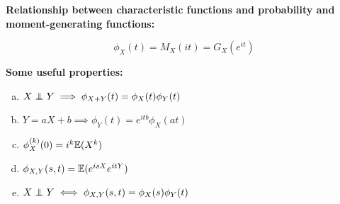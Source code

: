 \begin{remark} \textbf{Relationship between characteristic functions and probability and moment-generating functions:}

\[
\phi_X(t)  =M_X(it) = G_X(e^{it})
\]

\end{remark}

\begin{theorem}

\textbf{Some useful properties:}

\begin{enumerate}[(a)]

\item \(X \indep Y \implies \phi_{X + Y}(t) = \phi_X(t) \phi_Y(t)\)

\item \(Y = aX + b \implies \phi_Y(t) = e^{itb} \phi_X(at)\)

\item \(\phi_X^{(k)}(0) = i^k \E(X^k)\)

\item \(\phi_{X,Y}(s,t) = \E(e^{isX}e^{itY})\)

\item \(X \indep Y \iff \phi_{X,Y}(s,t) = \phi_X(s) \phi_Y(t)\)

\end{enumerate}

\end{theorem}


